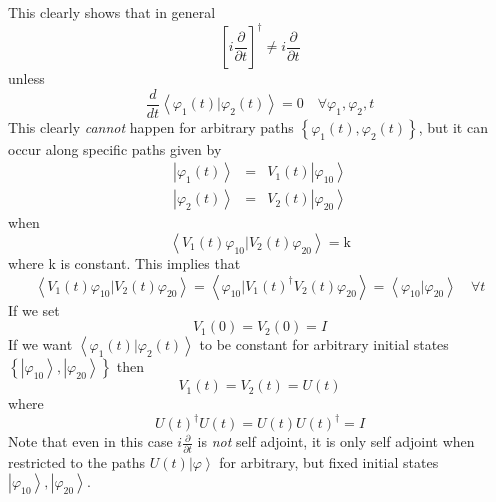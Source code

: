 \documentclass[aps,preprint]{revtex4}
\begin{document}
This clearly shows that in general 
\begin{equation}
\left[ i\frac{\partial }{\partial t}\right] ^{\dagger }\neq i\frac{\partial 
}{\partial t}
\end{equation}%
unless 
\begin{equation}
\frac{d}{dt}\left\langle \varphi _{1}\left( t\right) |\varphi _{2}\left(
t\right) \right\rangle =0\quad \forall \varphi _{1},\varphi _{2},t
\end{equation}%
This clearly \emph{cannot} happen for arbitrary paths $\left\{ \varphi
_{1}\left( t\right) ,\varphi _{2}\left( t\right) \right\} $, but it can
occur along specific paths given by 
\begin{eqnarray}
\left| \varphi _{1}\left( t\right) \right\rangle &=&V_{1}\left( t\right)
\left| \varphi _{10}\right\rangle \\
\left| \varphi _{2}\left( t\right) \right\rangle &=&V_{2}\left( t\right)
\left| \varphi _{20}\right\rangle
\end{eqnarray}%
when%
\begin{equation}
\left\langle V_{1}\left( t\right) \varphi _{10}|V_{2}\left( t\right) \varphi
_{20}\right\rangle =\text{k}
\end{equation}%
where k is constant. This implies that 
\begin{equation}
\left\langle V_{1}\left( t\right) \varphi _{10}|V_{2}\left( t\right) \varphi
_{20}\right\rangle =\left\langle \varphi _{10}|V_{1}\left( t\right)
^{\dagger }V_{2}\left( t\right) \varphi _{20}\right\rangle =\left\langle
\varphi _{10}|\varphi _{20}\right\rangle \quad \forall t
\end{equation}%
If we set 
\begin{equation}
V_{1}\left( 0\right) =V_{2}\left( 0\right) =I
\end{equation}%
If we want $\left\langle \varphi _{1}\left( t\right) |\varphi _{2}\left(
t\right) \right\rangle $ to be constant for arbitrary initial states $%
\left\{ \left| \varphi _{10}\right\rangle ,\left| \varphi _{20}\right\rangle
\right\} $ then 
\begin{equation}
V_{1}\left( t\right) =V_{2}\left( t\right) =U\left( t\right)
\end{equation}%
where 
\begin{equation}
U\left( t\right) ^{\dagger }U\left( t\right) =U\left( t\right) U\left(
t\right) ^{\dagger }=I
\end{equation}%
Note that even in this case $i\frac{\partial }{\partial t}$ is \emph{not }%
self adjoint, it is only self adjoint when restricted to the paths $U\left(
t\right) \left| \varphi \right\rangle $ for arbitrary, but fixed initial
states $\left| \varphi _{10}\right\rangle ,\left| \varphi _{20}\right\rangle 
$.
\end{document}
